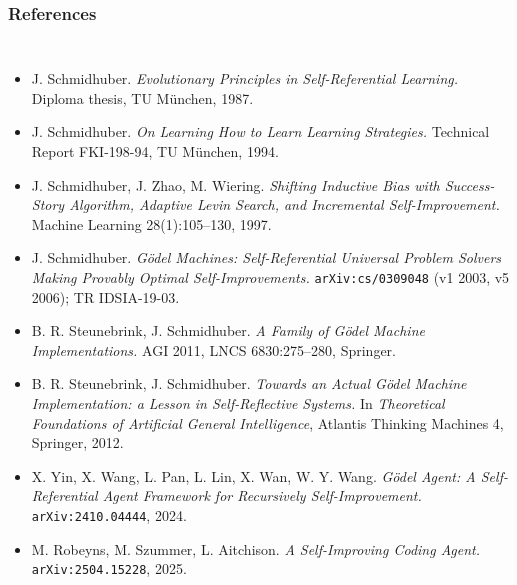 \documentclass[aspectratio=169]{beamer}
\begin{document}
\begin{frame}
  \frametitle{References}
  \begin{columns}[t]

      {\fontsize{6}{7.1}\selectfont
       \begin{itemize}\itemsep0.5pt
       \item J. Schmidhuber. \emph{Evolutionary Principles in Self-Referential
         Learning.} Diploma thesis, TU M\"unchen, 1987.
       \item J. Schmidhuber. \emph{On Learning How to Learn Learning
         Strategies.} Technical Report FKI-198-94, TU M\"unchen, 1994.
       \item J. Schmidhuber, J. Zhao, M. Wiering. \emph{Shifting Inductive Bias
         with Success-Story Algorithm, Adaptive Levin Search, and Incremental
         Self-Improvement.} Machine Learning 28(1):105--130, 1997.
       \item J. Schmidhuber. \emph{G\"odel Machines: Self-Referential Universal
         Problem Solvers Making Provably Optimal Self-Improvements.}
         \texttt{arXiv:cs/0309048} (v1 2003, v5 2006); TR IDSIA-19-03.
       \item B. R. Steunebrink, J. Schmidhuber. \emph{A Family of G\"odel Machine
         Implementations.} AGI 2011, LNCS 6830:275--280, Springer.
       \item B. R. Steunebrink, J. Schmidhuber. \emph{Towards an Actual G\"odel
         Machine Implementation: a Lesson in Self-Reflective Systems.} In
         \emph{Theoretical Foundations of Artificial General Intelligence},
         Atlantis Thinking Machines 4, Springer, 2012.
       \item X. Yin, X. Wang, L. Pan, L. Lin, X. Wan, W. Y. Wang.
         \emph{G\"odel Agent: A Self-Referential Agent Framework for Recursively
         Self-Improvement.} \texttt{arXiv:2410.04444}, 2024.
              \item M. Robeyns, M. Szummer, L. Aitchison. \emph{A Self-Improving Coding
         Agent.} \texttt{arXiv:2504.15228}, 2025.
       \end{itemize}}


\end{columns}
\end{frame}
\end{document}
